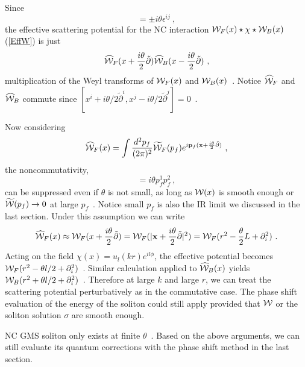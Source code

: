 \documentclass[a4paper,a4paper]{article}
\def\cW{{\cal W}}
\def\bp{{\bf p}}
\def\bx{{{\bf x}}}
\def\tpartial{{\tilde{\partial}}}
\def\bpartial{{\bf \partial}}
\def\tbpartial{{\tilde{\bpartial}}}
\def\fitheta{{\frac{i\theta}2}}
\def\ftheta{{\frac{\theta}2}}
\begin{document}
Since 
\begin{equation}
   [x^i\pm\fitheta\tpartial^i,x^j\pm\fitheta\tpartial^j]=\pm
i\theta\epsilon^{ij}\ ,
\end{equation} 
the effective scattering potential for the NC 
interaction $\cW_F(x)\star\chi\star\cW_B(x)$ (\ref{EffW}) is just 
\begin{equation}
\widehat{\cW}_F(x+\fitheta\tpartial)
\widehat{\cW}_B(x-\fitheta\tpartial)\ ,
\end{equation}
multiplication of the Weyl transforms of 
$\cW_F(x)$ and $\cW_B(x)$\ . Notice $\widehat{\cW}_F$ and $\widehat{\cW}_B$ 
commute since $[x^i+i\theta/2\tpartial^i,x^j-i\theta/2\tpartial^j]=0$\ .

Now considering 
\begin{equation}
  \widehat{\cW}_F(x)=\int\frac{d^2p_f}{(2\pi)^2}\widetilde{\cW}_F(p_f)
e^{i\bp_f(\bx+\fitheta\tbpartial)}\ ,
\end{equation}
the noncommutativity, 
\begin{equation}
[p_f^1(x^1+\fitheta\tpartial^1)\ ,
p_f^2(x^2+\fitheta\tpartial^2)]=i\theta p_f^1p_f^2\ ,                                         \label{Noncom}
\end{equation}
can be suppressed 
even if $\theta$ is not small, as long as $\cW(x)$ is smooth enough 
or $\widetilde{\cW}(p_f)\rightarrow 0$ at large $p_f$\ . 
Notice small $p_f$ is also the IR limit 
we discussed in the last section. Under this assumption we can write
\begin{equation}
  \widehat{\cW}_F(x)\approx\cW_F(x+\fitheta\tpartial)=
\cW_F(|\bx+\fitheta\tbpartial|^2)=\cW_F(r^2-\ftheta L+\partial_i^2)\ .
\end{equation}
Acting on the field 
$\chi(x)=u_l(kr)e^{il\phi}$, the effective potential becomes 
$  \cW_F(r^2-{\theta l}/{2}+\partial_i^2)$\ . Similar calculation 
applied to $\widehat{\cW}_B(x)$ yields $\cW_B(r^2+{\theta l}/{2}+\partial_i^2)$\ . 
Therefore at large $k$ and 
large $r$, we can treat the scattering potential perturbatively as in the 
commutative case.    
The phase shift evaluation of the energy of the soliton could still 
apply provided that $\cW$ or the soliton solution $\sigma$ are smooth enough. 

NC GMS soliton only exists at finite $\theta$\ . Based on 
the above arguments, we can still evaluate its quantum corrections with 
the phase shift method in the last section. 
\end{document}
